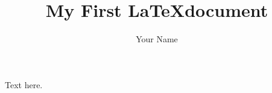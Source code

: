 \documentclass[12pt]{article}
\title{My First \LaTeX document}
\author{Your Name}
\begin{document}
\maketitle

Text here.
\end{document}
